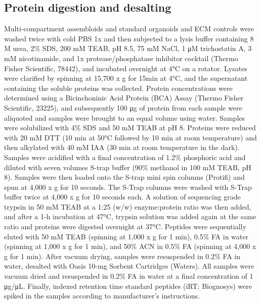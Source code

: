 \begin{refsection}
    \subsection{Protein digestion and desalting}
    Multi-compartment assembloids and standard organoids and ECM controls were washed twice with cold PBS 1x and then subjected to a lysis buffer containing 8 M urea, 2\% SDS, 200 mM TEAB, pH 8.5, 75 mM NaCl, 1 μM trichostatin A, 3 mM nicotinamide, and 1x protease/phosphatase inhibitor cocktail (Thermo Fisher Scientific, 78442), and incubated overnight at 4°C on a rotator.  Lysates were clarified by spinning at 15,700 x g for 15min at 4°C, and the supernatant containing the soluble proteins was collected. Protein concentrations were determined using a Bicinchoninic Acid Protein (BCA) Assay (Thermo Fisher Scientific, 23225), and subsequently 100 μg of protein from each sample were aliquoted and samples were brought to an equal volume using water. Samples were solubilized with 4\% SDS and 50 mM TEAB at pH 8. Proteins were reduced with 20 mM DTT (10 min at 50°C followed by 10 min at room temperature) and then alkylated with 40 mM IAA (30 min at room temperature in the dark). Samples were acidified with a final concentration of 1.2\% phosphoric acid and diluted with seven volumes S-trap buffer (90\% methanol in 100 mM TEAB, pH 8). Samples were then loaded onto the S-trap mini spin columns (Protifi) and spun at 4,000 x g for 10 seconds. The S-Trap columns were washed with S-Trap buffer twice at 4,000 x g for 10 seconds each. A solution of sequencing grade trypsin in 50 mM TEAB at a 1:25 (w/w) enzyme:protein ratio was then added, and after a 1-h incubation at 47°C, trypsin solution was added again at the same ratio and proteins were digested overnight at 37°C. Peptides were sequentially eluted with 50 mM TEAB (spinning at 1,000 x g for 1 min), 0.5\% FA in water (spinning at 1,000 x g for 1 min), and 50\% ACN in 0.5\% FA (spinning at 4,000 x g for 1 min). After vacuum drying, samples were resuspended in 0.2\% FA in water, desalted with Oasis 10-mg Sorbent Cartridges (Waters). All samples were vacuum dried and resuspended in 0.2\% FA in water at a final concentration of 1 μg/μL. Finally, indexed retention time standard peptides (iRT; Biognosys)\cite{escher2012a} were spiked in the samples according to manufacturer’s instructions.
    

\end{refsection}
